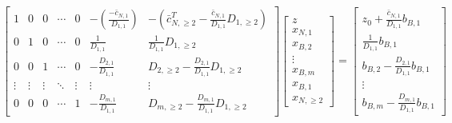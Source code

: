 \documentclass[border=3pt,math]{standalone}
\begin{document}
{
\renewcommand{\arraystretch}{2.0}
\setlength{\arraycolsep}{7pt}

    \[
        \left[ \begin{array}{c|cccc|cc}
            1       & 0         & 0         & \cdots    & 0         & - (\frac{- \bar{c}_{N, 1}}{D_{1, 1}}) & - (\bar{c}_{N, \geq 2}^T - \frac{\bar{c}_{N, 1}}{D_{1, 1}} D_{1, \geq 2}) \\
            \hline
            0       & 1         & 0         & \cdots    & 0         & \frac{1}{D_{1, 1}}                    & \frac{1}{D_{1, 1}} D_{1, \geq 2}                                          \\
            0       & 0         & 1         & \cdots    & 0         & - \frac{D_{2, 1}}{D_{1, 1}}           & D_{2, \geq 2} - \frac{D_{2, 1}}{D_{1, 1}} D_{1, \geq 2}                   \\
            \vdots  & \vdots    & \vdots    & \ddots    & \vdots    & \vdots                                & \vdots                                                                    \\
            0       & 0         & 0         & \cdots    & 1         & - \frac{D_{m, 1}}{D_{1, 1}}           & D_{m, \geq 2} - \frac{D_{m, 1}}{D_{1, 1}} D_{1, \geq 2}
        \end{array} \right]
        \left[ \begin{array}{c}
            z           \\
            \hline
            x_{N, 1}    \\
            x_{B, 2}    \\
            \vdots      \\
            x_{B, m}    \\
            \hline
            x_{B, 1}    \\
            x_{N, \geq 2}
        \end{array} \right]
        =
        \left[ \begin{array}{c}
            z_0 + \frac{\bar{c}_{N, 1}}{D_{1, 1}} b_{B, 1}                                           \\
            \hline
            \frac{1}{D_{1, 1}} b_{B, 1}                     \\
            b_{B, 2} - \frac{D_{2, 1}}{D_{1, 1}} b_{B, 1}   \\
            \vdots                                          \\
            b_{B, m} - \frac{D_{m, 1}}{D_{1, 1}} b_{B, 1}
        \end{array} \right]
    \]
}
\end{document}
